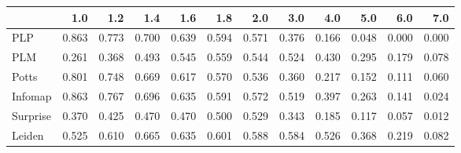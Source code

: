 \begin{tabular}{lrrrrrrrrrrr}
\toprule
{} &   1.0 &   1.2 &   1.4 &   1.6 &   1.8 &   2.0 &   3.0 &   4.0 &   5.0 &   6.0 &   7.0 \\
\midrule
PLP      & 0.863 & 0.773 & 0.700 & 0.639 & 0.594 & 0.571 & 0.376 & 0.166 & 0.048 & 0.000 & 0.000 \\
PLM      & 0.261 & 0.368 & 0.493 & 0.545 & 0.559 & 0.544 & 0.524 & 0.430 & 0.295 & 0.179 & 0.078 \\
Potts    & 0.801 & 0.748 & 0.669 & 0.617 & 0.570 & 0.536 & 0.360 & 0.217 & 0.152 & 0.111 & 0.060 \\
Infomap  & 0.863 & 0.767 & 0.696 & 0.635 & 0.591 & 0.572 & 0.519 & 0.397 & 0.263 & 0.141 & 0.024 \\
Surprise & 0.370 & 0.425 & 0.470 & 0.470 & 0.500 & 0.529 & 0.343 & 0.185 & 0.117 & 0.057 & 0.012 \\
Leiden   & 0.525 & 0.610 & 0.665 & 0.635 & 0.601 & 0.588 & 0.584 & 0.526 & 0.368 & 0.219 & 0.082 \\
\bottomrule
\end{tabular}
